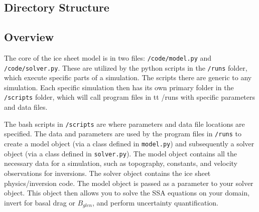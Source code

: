 \documentclass[11pt, reqno, nocenter]{article}
\begin{document}
\subsection{Directory Structure}


\subsection{Overview}

The core of the ice sheet model is in two files: {\tt /code/model.py} and {\tt /code/solver.py}. These are utilized by the python scripts in the {\tt /runs} folder, which execute specific parts of a simulation. The scripts there are generic to any simulation. Each specific simulation then has its own primary folder in the {\tt /scripts} folder, which will call program files in {tt /runs} with specific parameters and data files.

The bash scripts in {\tt /scripts} are where parameters and data file locations are specified. The data and parameters are used by the program files in {\tt /runs} to create a model object (via a class defined in {\tt model.py}) and subsequently a solver object (via a class defined in {\tt solver.py}). The model object contains all the necessary data for a simulation, such as topography, constants, and velocity observations for inversions. The solver object contains the ice sheet physics/inversion code. The model object is passed as a parameter to your solver object. This object then allows you to solve the SSA equations on your domain, invert for basal drag or $B_{glen}$, and perform uncertainty quantification. 
\end{document}
